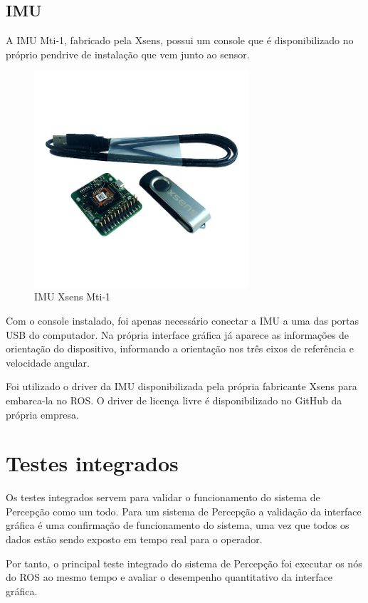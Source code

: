 	\subsection{IMU}
	    
	    A IMU Mti-1, fabricado pela Xsens, possui um console que é disponibilizado no próprio pendrive de instalação que vem junto ao sensor.
	    
	    \begin{figure}[!ht]
		   \centering
		   \includegraphics[width=8cm]{Figures/imu.jpg}
		   \caption{IMU Xsens Mti-1}
		   \label{fig:IMU}
		\end{figure}
	    
	     Com o console instalado, foi apenas necessário conectar a IMU a uma das portas USB do computador. Na própria interface gráfica já aparece as informações de orientação do dispositivo, informando a orientação nos três eixos de referência e velocidade angular.

		 Foi utilizado o driver da IMU disponibilizada pela própria fabricante Xsens para embarca-la no ROS. O driver de licença livre é disponibilizado no GitHub da própria empresa.	

 
\section{Testes integrados}
\label{sec:testi}

Os testes integrados servem para validar o funcionamento do sistema de Percepção como um  todo. Para um sistema de Percepção a validação da interface gráfica é uma confirmação de funcionamento do sistema, uma vez que todos os dados estão sendo exposto em tempo real para o operador. 

Por tanto, o principal teste integrado do sistema de Percepção foi executar os nós do ROS ao mesmo tempo e avaliar o desempenho quantitativo da interface gráfica.

